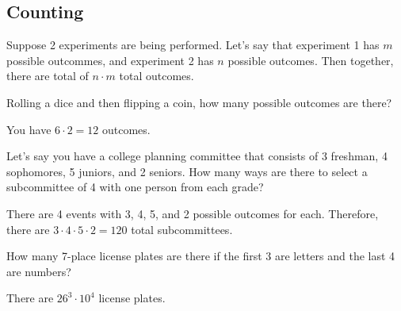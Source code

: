 \subsection{Counting}

Suppose 2 experiments are being performed. Let's say that experiment 1 has \( m \) possible outcommes, and experiment 2 has \( n \) possible outcomes. Then together, there are total of \( n\cdot m \) total outcomes.

\begin{eg}
	Rolling a dice and then flipping a coin, how many possible outcomes are there?
\end{eg}
\begin{explanation}
	You have \( 6 \cdot 2 = 12  \) outcomes.
\end{explanation}

\begin{eg}
	Let's say you have a college planning committee that consists of 3 freshman, 4 sophomores, 5 juniors, and 2 seniors. How many ways are there to select a subcommittee of 4 with one person from each grade?
\end{eg}
\begin{explanation}
	There are 4 events with 3, 4, 5, and 2 possible outcomes for each. Therefore, there are \( 3\cdot 4\cdot 5\cdot 2=120 \) total subcommittees.
\end{explanation}

\begin{eg}
	How many 7-place license plates are there if the first 3 are letters and the last 4 are numbers?
\end{eg}
\begin{explanation}
	There are \( 26^3 \cdot 10^4 \) license plates.
\end{explanation}
